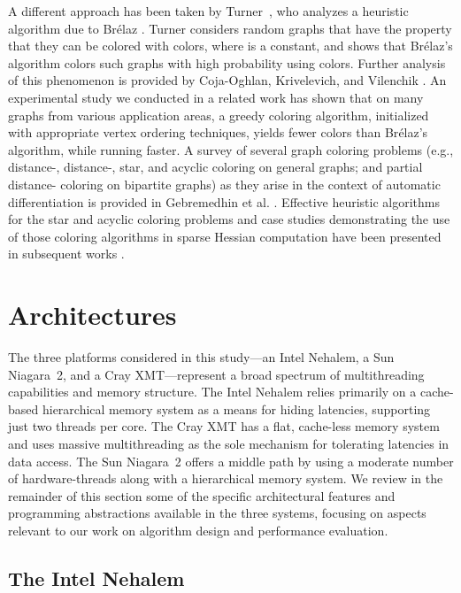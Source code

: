 \documentclass{article}
\begin{document}
A different approach has been taken by Turner~\cite{Turner}, 
who analyzes a heuristic algorithm due to Br{\'{e}}laz \cite{Brelaz}. 
Turner considers random graphs that have the property that they can be colored with  colors, 
where  is a constant, and shows that Br{\'{e}}laz's algorithm colors such graphs  
with high probability using  colors. 
Further analysis of this phenomenon is provided by Coja-Oghlan, Krivelevich, and 
Vilenchik \cite{Oghlan}. 
An experimental study we conducted in a related work \cite{colpack-acm}
has shown that on many graphs from various application areas,  
a greedy coloring algorithm, initialized with appropriate vertex ordering techniques,  
yields fewer colors than Br{\'{e}}laz's algorithm, while running faster.
A survey of several graph coloring problems (e.g., distance-, distance-, star, and 
acyclic coloring on general graphs; and partial distance- coloring  on bipartite graphs) 
as they arise in the context of automatic differentiation is provided in 
Gebremedhin et al. \cite{GMP05}. 
Effective heuristic algorithms for the star and acyclic coloring problems and case studies
demonstrating the use of those coloring algorithms in sparse Hessian computation have been 
presented in subsequent works  \cite{GTMP07, GPTW09}.  

\section{Architectures}
\label{sec:platforms}

The three platforms considered in this study---an Intel Nehalem, a Sun Niagara~2, 
and a Cray XMT---represent a broad spectrum of multithreading capabilities and memory structure.
The Intel Nehalem relies primarily on a cache-based hierarchical
memory system as a means for hiding latencies, supporting just
two threads per core.  
The Cray XMT has a flat, cache-less memory system and uses
massive multithreading as the sole mechanism for tolerating latencies
in data access.
The Sun Niagara~2 offers a middle path by using a moderate number
of hardware-threads along with a hierarchical memory system. 
We review in the remainder of this section some of the specific architectural features 
and programming abstractions available in the three systems, focusing on aspects 
relevant to our work on algorithm design and performance evaluation.

\subsection{The Intel Nehalem}
\label{sec:nehalem}
\end{document}
